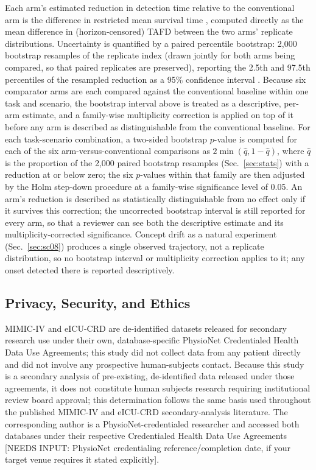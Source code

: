 \documentclass[apajournal,article,submit,oneauthor]{Definitions/mdpi}
\begin{document}
Each arm's estimated reduction in detection time relative to the conventional arm is the difference in restricted mean survival time \citep{royston2013}, computed directly as the mean difference in (horizon-censored) TAFD between the two arms' replicate distributions. Uncertainty is quantified by a paired percentile bootstrap: 2{,}000 bootstrap resamples of the replicate index (drawn jointly for both arms being compared, so that paired replicates are preserved), reporting the 2.5th and 97.5th percentiles of the resampled reduction as a 95\% confidence interval \citep{efron1979}. Because six comparator arms are each compared against the conventional baseline within one task and scenario, the bootstrap interval above is treated as a descriptive, per-arm estimate, and a family-wise multiplicity correction is applied on top of it before any arm is described as distinguishable from the conventional baseline. For each task-scenario combination, a two-sided bootstrap $p$-value is computed for each of the six arm-versus-conventional comparisons as $2 \min(\hat{q}, 1-\hat{q})$, where $\hat{q}$ is the proportion of the 2{,}000 paired bootstrap resamples (Sec.~\ref{sec:stats}) with a reduction at or below zero; the six $p$-values within that family are then adjusted by the Holm step-down procedure \citep{holm1979} at a family-wise significance level of 0.05. An arm's reduction is described as statistically distinguishable from no effect only if it survives this correction; the uncorrected bootstrap interval is still reported for every arm, so that a reviewer can see both the descriptive estimate and its multiplicity-corrected significance. Concept drift as a natural experiment (Sec.~\ref{sec:sc08}) produces a single observed trajectory, not a replicate distribution, so no bootstrap interval or multiplicity correction applies to it; any onset detected there is reported descriptively.

\subsection{Privacy, Security, and Ethics}

MIMIC-IV and eICU-CRD are de-identified datasets released for secondary research use under their own, database-specific PhysioNet Credentialed Health Data Use Agreements; this study did not collect data from any patient directly and did not involve any prospective human-subjects contact. Because this study is a secondary analysis of pre-existing, de-identified data released under those agreements, it does not constitute human subjects research requiring institutional review board approval; this determination follows the same basis used throughout the published MIMIC-IV and eICU-CRD secondary-analysis literature. The corresponding author is a PhysioNet-credentialed researcher and accessed both databases under their respective Credentialed Health Data Use Agreements [NEEDS INPUT: PhysioNet credentialing reference/completion date, if your target venue requires it stated explicitly].
\end{document}
